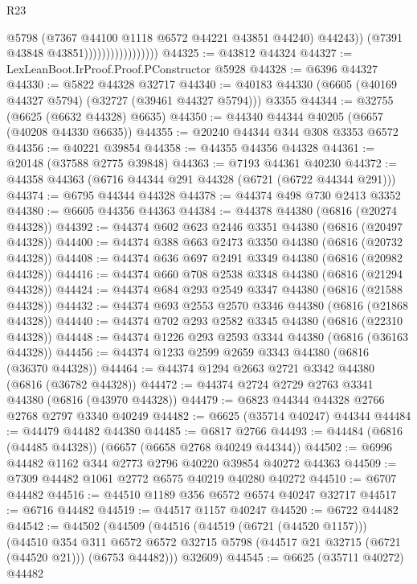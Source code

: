 \begin{lexlean}{R23}
\begin{coremodule}
                                        @5798
                                        (@7367 @44100 @1118 @6572 @44221 @43851 @44240)
                                        @44243))
                                    (@7391 @43848 @43851)))))))))))))))))
@44325 := @43812 @44324
@44327 := LexLeanBoot.IrProof.Proof.PConstructor @5928
@44328 := @6396 @44327
@44330 := @5822 @44328 @32717
@44340 := @40183 @44330 (@6605 (@40169 @44327 @5794) (@32727 (@39461 @44327 @5794))) @3355
@44344 := @32755 (@6625 (@6632 @44328) @6635)
@44350 := @44340 @44344 @40205 (@6657 (@40208 @44330 @6635))
@44355 := @20240 @44344 @344 @308 @3353 @6572
@44356 := @40221 @39854
@44358 := @44355 @44356 @44328
@44361 := @20148 (@37588 @2775 @39848)
@44363 := @7193 @44361 @40230
@44372 := @44358 @44363 (@6716 @44344 @291 @44328 (@6721 (@6722 @44344 @291)))
@44374 := @6795 @44344 @44328
@44378 := @44374 @498 @730 @2413 @3352
@44380 := @6605 @44356 @44363
@44384 := @44378 @44380 (@6816 (@20274 @44328))
@44392 := @44374 @602 @623 @2446 @3351 @44380 (@6816 (@20497 @44328))
@44400 := @44374 @388 @663 @2473 @3350 @44380 (@6816 (@20732 @44328))
@44408 := @44374 @636 @697 @2491 @3349 @44380 (@6816 (@20982 @44328))
@44416 := @44374 @660 @708 @2538 @3348 @44380 (@6816 (@21294 @44328))
@44424 := @44374 @684 @293 @2549 @3347 @44380 (@6816 (@21588 @44328))
@44432 := @44374 @693 @2553 @2570 @3346 @44380 (@6816 (@21868 @44328))
@44440 := @44374 @702 @293 @2582 @3345 @44380 (@6816 (@22310 @44328))
@44448 := @44374 @1226 @293 @2593 @3344 @44380 (@6816 (@36163 @44328))
@44456 := @44374 @1233 @2599 @2659 @3343 @44380 (@6816 (@36370 @44328))
@44464 := @44374 @1294 @2663 @2721 @3342 @44380 (@6816 (@36782 @44328))
@44472 := @44374 @2724 @2729 @2763 @3341 @44380 (@6816 (@43970 @44328))
@44479 := @6823 @44344 @44328 @2766 @2768 @2797 @3340 @40249
@44482 := @6625 (@35714 @40247) @44344
@44484 := @44479 @44482 @44380
@44485 := @6817 @2766
@44493 := @44484 (@6816 (@44485 @44328)) (@6657 (@6658 @2768 @40249 @44344))
@44502 := @6996 @44482 @1162 @344 @2773 @2796 @40220 @39854 @40272 @44363
@44509 := @7309 @44482 @1061 @2772 @6575 @40219 @40280 @40272
@44510 := @6707 @44482
@44516 := @44510 @1189 @356 @6572 @6574 @40247 @32717
@44517 := @6716 @44482
@44519 := @44517 @1157 @40247
@44520 := @6722 @44482
@44542 := @44502
    (@44509
      (@44516
        (@44519 (@6721 (@44520 @1157)))
        (@44510
          @354
          @311
          @6572
          @6572
          @32715
          @5798
          (@44517 @21 @32715 (@6721 (@44520 @21)))
          (@6753 @44482)))
      @32609)
@44545 := @6625 (@35711 @40272) @44482

\end{coremodule}
\end{lexlean}
